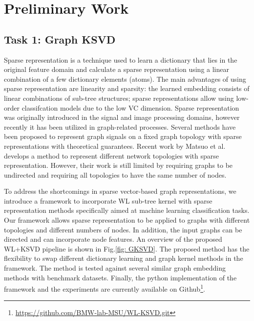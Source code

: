 \chapter{Preliminary Work}\label{ch:Preliminary}

\section{Task 1: Graph KSVD}

Sparse representation is a technique used to learn a dictionary that lies in the original feature domain and calculate a sparse representation using a linear combination of a few dictionary elements (atoms)\cite{Elad2010}. %
The main advantages of using sparse representation are linearity and sparsity: the learned embedding consists of linear combinations of sub-tree structures; sparse representations allow using low-order classifcation models due to the low VC dimension\cite{Neylon2006}. Sparse representation was originally introduced in the signal and image processing domains, however recently it has been utilized in graph-related processes. Several methods have been proposed to represent graph signals on a fixed graph topology with sparse representations with theoretical guarantees\cite{Yankelevsky2019}. %
Recent work by Matsuo et al.\cite{Matsuo2019} develops a method to represent different network topologies with sparse representation. However, their work is still limited by requiring graphs to be undirected and requiring all topologies to have the same number of nodes.

To address the shortcomings in sparse vector-based graph representations, we introduce a framework to incorporate WL sub-tree kernel with sparse representation methods specifically aimed at machine learning classification tasks. Our framework allows sparse representation to be applied to graphs with different topologies and different numbers of nodes. In addition, the input graphs can be directed and can incorporate node features. An overview of the proposed WL+KSVD pipeline is shown in Fig.\ref{fig: GKSVD}. The proposed method has the flexibility to swap different dictionary learning and graph kernel methods in the framework. The method is tested against several similar graph embedding methods with benchmark datasets. Finally, the python implementation of the framework and the experiments are currently available on Github\footnote{\url{https://github.com/BMW-lab-MSU/WL-KSVD.git}}.


